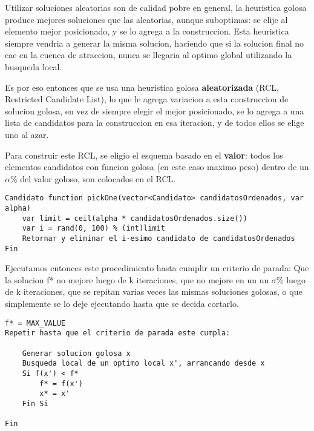Utilizar soluciones aleatorias son de calidad pobre en general, la heuristica golosa produce mejores soluciones que las aleatorias, aunque suboptimas: se elije al elemento mejor posicionado, y se lo agrega a la construccion. Esta heuristica siempre vendria a generar la misma solucion, haciendo que si la solucion final no cae en la cuenca de atraccion, nunca se llegaria al optimo global utilizando la busqueda local.

Es por eso entonces que se usa una heuristica golosa \textbf{aleatorizada} (RCL, Restricted Candidate List), lo que le agrega variacion a esta construccion de solucion golosa, en vez de siempre elegir el mejor posicionado, se lo agrega a una lista de candidatos para la construccion en esa iteracion, y de todos ellos se elige uno al azar.

Para construir este RCL, se eligio el esquema basado en el \textbf{valor}: todos los elementos candidatos con funcion golosa (en este caso maximo peso) dentro de un $\alpha$\% del valor goloso, son colocados en el RCL.

\begin{lstlisting}
Candidato function pickOne(vector<Candidato> candidatosOrdenados, var alpha)
	var limit = ceil(alpha * candidatosOrdenados.size())
	var i = rand(0, 100) % (int)limit
	Retornar y eliminar el i-esimo candidato de candidatosOrdenados
Fin
\end{lstlisting}

Ejecutamos entonces este procedimiento hasta cumplir un criterio de parada: Que la solucion f* no mejore luego de k iteraciones, que no mejore en un un $\sigma$\% luego de k iteraciones, que se repitan varias veces las mismas soluciones golosas, o que simplemente se lo deje ejecutando hasta que se decida cortarlo.

\begin{lstlisting}
f* = MAX_VALUE
Repetir hasta que el criterio de parada este cumpla:

	Generar solucion golosa x
	Busqueda local de un optimo local x', arrancando desde x
	Si f(x') < f*
		f* = f(x')
		x* = x'
	Fin Si

Fin
\end{lstlisting}
